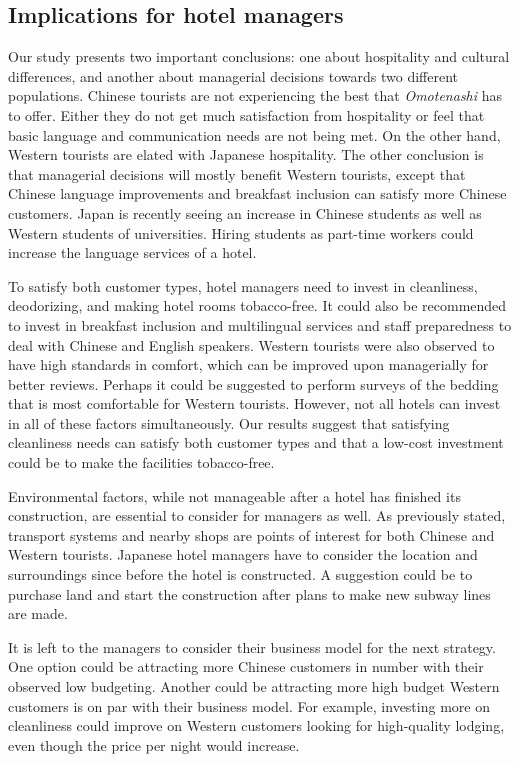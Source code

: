 \documentclass[smallextended,natbib]{svjour3}       %
\begin{document}
  \subsection{Implications for hotel managers}\label{disc:implications}

    Our study presents two important conclusions: one about hospitality and cultural differences, and another about managerial decisions towards two different populations. Chinese tourists are not experiencing the best that \textit{Omotenashi} has to offer. Either they do not get much satisfaction from hospitality or feel that basic language and communication needs are not being met. On the other hand, Western tourists are elated with Japanese hospitality. The other conclusion is that managerial decisions will mostly benefit Western tourists, except that Chinese language improvements and breakfast inclusion can satisfy more Chinese customers. Japan is recently seeing an increase in Chinese students as well as Western students of universities. Hiring students as part-time workers could increase the language services of a hotel.

    To satisfy both customer types, hotel managers need to invest in cleanliness, deodorizing, and making hotel rooms tobacco-free. It could also be recommended to invest in breakfast inclusion and multilingual services and staff preparedness to deal with Chinese and English speakers. Western tourists were also observed to have high standards in comfort, which can be improved upon managerially for better reviews. Perhaps it could be suggested to perform surveys of the bedding that is most comfortable for Western tourists. However, not all hotels can invest in all of these factors simultaneously. Our results suggest that satisfying cleanliness needs can satisfy both customer types and that a low-cost investment could be to make the facilities tobacco-free. 

    Environmental factors, while not manageable after a hotel has finished its construction, are essential to consider for managers as well. As previously stated, transport systems and nearby shops are points of interest for both Chinese and Western tourists. Japanese hotel managers have to consider the location and surroundings since before the hotel is constructed. A suggestion could be to purchase land and start the construction after plans to make new subway lines are made. 

    It is left to the managers to consider their business model for the next strategy. One option could be attracting more Chinese customers in number with their observed low budgeting. Another could be attracting more high budget Western customers is on par with their business model. For example, investing more on cleanliness could improve on Western customers looking for high-quality lodging, even though the price per night would increase.
\end{document}
